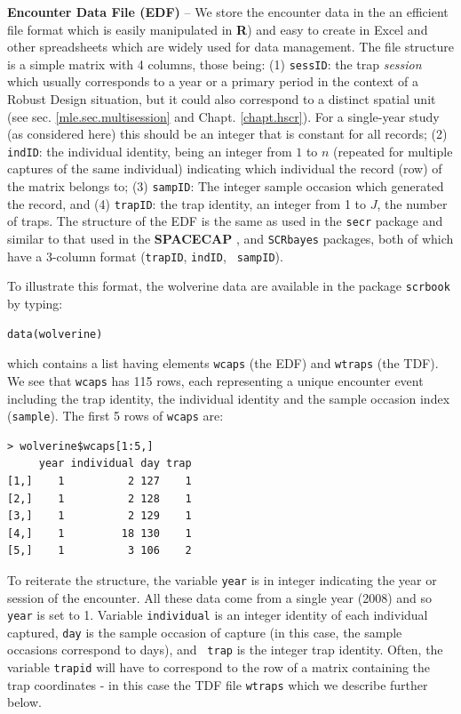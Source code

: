 {\flushleft \bf Encounter Data File (EDF)} --
We store the encounter data in the
an efficient file format which is easily manipulated in {\bf R}) and
easy to create in  Excel and other spreadsheets which are widely used
for data management.
The file
structure is a simple matrix with 4 columns, those being: (1)
\mbox{\tt sessID}: the trap
{\it session} which usually corresponds to a year or a primary period
in the context of a Robust Design situation, but it could also
correspond to a distinct spatial unit (see
sec. \ref{mle.sec.multisession} and Chapt. \ref{chapt.hscr}).
For a single-year study (as considered here) this
should be an integer  that is constant for all records; (2) \mbox{\tt indID}: the
individual identity, being an integer from $1$ to $n$ (repeated for
multiple captures of the same individual) indicating which
individual the record (row) of the matrix belongs to; (3) \mbox{\tt sampID}: The integer sample
occasion which generated the record, and (4) \mbox{\tt trapID}: the
trap identity, an
integer from 1 to $J$, the number of traps.  The structure of the EDF
is the same as used in the \mbox{\tt secr} package \citep{efford:2011}
and similar to that used
in the {\bf SPACECAP} \citep{gopalaswamy_etal:2012mee}, and
\mbox{\tt SCRbayes} \citep{russell_etal:2012} packages, both of which
have a 3-column format (\mbox{\tt trapID}, \mbox{\tt indID}, \mbox{\tt
  sampID}).

To illustrate this format, the wolverine data are available in the
package \mbox{\tt scrbook} by typing:
\begin{verbatim}
data(wolverine)
\end{verbatim}
which contains a list having elements \mbox{\tt wcaps} (the EDF) and
\mbox{\tt wtraps} (the TDF).  We see that \mbox{\tt wcaps} has 115
rows, each representing a unique encounter event including the trap
identity, the individual identity and the sample occasion index
(\mbox{\tt sample}).  The first 5 rows of \mbox{\tt wcaps} are:
{\small
\begin{verbatim}
> wolverine$wcaps[1:5,]
     year individual day trap
[1,]    1          2 127    1
[2,]    1          2 128    1
[3,]    1          2 129    1
[4,]    1         18 130    1
[5,]    1          3 106    2
\end{verbatim}
}
To reiterate the structure, the variable \mbox{\tt year} is in
integer indicating the year or session of the encounter. All these
data come from a single year (2008) and so \mbox{\tt year} is set to
1. Variable \mbox{\tt individual} is an integer identity of each
individual captured, \mbox{\tt day} is the sample occasion of capture
(in this case, the sample occasions correspond to days), and \mbox{\tt
  trap} is the integer trap identity.
Often, the variable \mbox{\tt trapid} will have to
correspond to the row of a matrix containing the trap coordinates - in
this case the TDF file \mbox{\tt wtraps} which we describe further below.

